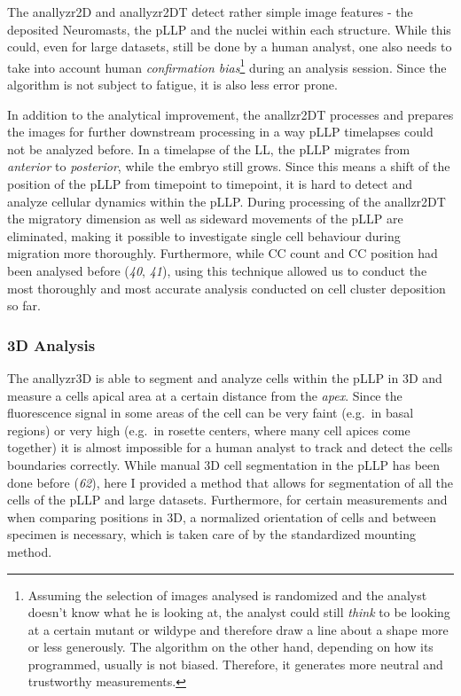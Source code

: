 \documentclass[11pt,singlespacinge,twoside]{reedthesis} %
\theoremstyle{definition}
\theoremstyle{definition}
\theoremstyle{definition}
\theoremstyle{remark}
\begin{document}
The anallyzr2D and anallyzr2DT detect rather simple image features - the deposited Neuromasts, the pLLP and the nuclei within each structure. While this could, even for large datasets, still be done by a human analyst, one also needs to take into account human \emph{confirmation bias}\footnote{Assuming the selection of images analysed is randomized and the analyst doesn't know what he is looking at, the analyst could still \emph{think} to be looking at a certain mutant or wildype and therefore draw a line about a shape more or less generously. The algorithm on the other hand, depending on how its programmed, usually is not biased. Therefore, it generates more neutral and trustworthy measurements.} during an analysis session. Since the algorithm is not subject to fatigue, it is also less error prone.

In addition to the analytical improvement, the anallzr2DT processes and prepares the images for further downstream processing in a way pLLP timelapses could not be analyzed before. In a timelapse of the LL, the pLLP migrates from \emph{anterior} to \emph{posterior}, while the embryo still grows. Since this means a shift of the position of the pLLP from timepoint to timepoint, it is hard to detect and analyze cellular dynamics within the pLLP. During processing of the anallzr2DT the migratory dimension as well as sideward movements of the pLLP are eliminated, making it possible to investigate single cell behaviour during migration more thoroughly. Furthermore, while CC count and CC position had been analysed before (\emph{40}, \emph{41}), using this technique allowed us to conduct the most thoroughly and most accurate analysis conducted on cell cluster deposition so far.

\hypertarget{d-analysis-1}{%
\subsubsection{3D Analysis}\label{d-analysis-1}}

The anallyzr3D is able to segment and analyze cells within the pLLP in 3D and measure a cells apical area at a certain distance from the \emph{apex}. Since the fluorescence signal in some areas of the cell can be very faint (e.g.~in basal regions) or very high (e.g.~in rosette centers, where many cell apices come together) it is almost impossible for a human analyst to track and detect the cells boundaries correctly. While manual 3D cell segmentation in the pLLP has been done before (\emph{62}), here I provided a method that allows for segmentation of all the cells of the pLLP and large datasets. Furthermore, for certain measurements and when comparing positions in 3D, a normalized orientation of cells and between specimen is necessary, which is taken care of by the standardized mounting method.
\end{document}
